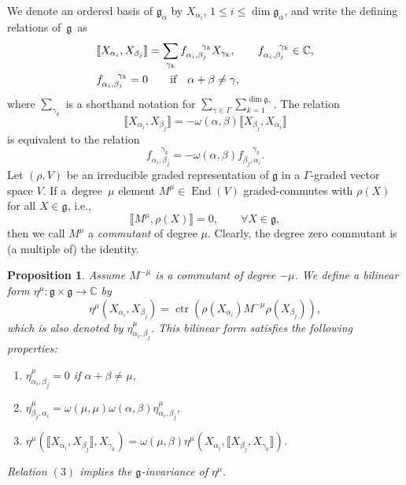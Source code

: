 \documentclass[pdftex]{sigma}
\numberwithin{equation}{section}
\newtheorem{Proposition}[Theorem]{Proposition}
\theoremstyle{definition}
\def\nn{\notag}
\def\g{\mathfrak{g}}
\begin{document}
We denote an ordered basis of $\g_{\alpha}$ by $ X_{\alpha_i}$, $1 \leq i \leq \dim \g_{\alpha}$, and write the defining relations of~$\g$~as
\begin{align}
	& 	\llbracket X_{\alpha_i}, X_{\beta_j} \rrbracket = \sum_{\gamma_k} f_{\alpha_i, \beta_j}^{\quad\ \gamma_k} X_{\gamma_k}, \qquad f_{\alpha_i, \beta_j}^{\quad\ \gamma_k} \in \mathbb{C}, \label{sumgammak}
	\\
	& f_{\alpha_i, \beta_j}^{\quad\ \gamma_k} = 0 \qquad \text{if} \quad \alpha + \beta \neq \gamma, \nn
\end{align}
where $\sum_{\gamma_k}$ is a shorthand notation for $\sum_{\gamma \in \Gamma} \sum_{k=1}^{\dim \g_{\gamma}}$.
The relation
\[
\llbracket X_{\alpha_i}, X_{\beta_j} \rrbracket = -\omega(\alpha,\beta) \llbracket X_{\beta_j}, X_{\alpha_i} \rrbracket
\]
 is equivalent to the relation
\begin{equation}
	f_{\alpha_i, \beta_j}^{\quad\ \gamma_k} = -\omega(\alpha,\beta) f_{\beta_j,\alpha_i}^{\quad\ \gamma_k}.
	\label{fskew}
\end{equation}
Let $(\rho,V)$ be an irreducible graded representation of $\g$ in a $\Gamma$-graded vector space $V$.
If a~degree~$\mu$ element $ M^{\mu} \in \operatorname{End}(V)$ graded-commutes with $\rho(X)$ for all $ X \in \g$, i.e.,
\begin{equation*}
	\llbracket M^{\mu}, \rho(X) \rrbracket = 0, \qquad \forall X \in \g,
\end{equation*}
then we call $M^{\mu}$ a \textit{commutant} of degree $\mu$.
Clearly, the degree zero commutant is (a multiple of) the identity.

\begin{Proposition} \label{PROP:BF}
Assume $M^{-\mu}$ is a commutant of degree $-\mu$.
	We define a bilinear form $\eta^{\mu}\colon \g \times \g \to \mathbb{C}$ by
	\begin{equation*}
		\eta^{\mu}(X_{\alpha_i}, X_{\beta_j}) = \operatorname{ctr}( \rho(X_{\alpha_i}) M^{-\mu} \rho(X_{\beta_j}) ), %
	\end{equation*}
	which is also denoted by $\eta^{\mu}_{\alpha_i,\beta_j}$. This bilinear form satisfies the following properties:
	\begin{enumerate}\itemsep=0pt
		\item[$(1)$] $ \eta^{\mu}_{\alpha_i, \beta_j} = 0$ if $ \alpha + \beta \neq \mu$,
		\item[$(2)$] $ \eta^{\mu}_{\beta_j,\alpha_i} = \omega(\mu,\mu) \omega(\alpha,\beta) \eta^{\mu}_{\alpha_i, \beta_j} $,
		\item[$(3)$] $ \eta^{\mu}(\llbracket X_{\alpha_i}, X_{\beta_j} \rrbracket, X_{\gamma_k} ) = \omega(\mu,\beta) \eta^{\mu}(X_{\alpha_i}, \llbracket X_{\beta_j}, X_{\gamma_k} \rrbracket) $.
	\end{enumerate}
	Relation $(3)$ implies the $\g$-invariance of $\eta^{\mu}$.
\end{Proposition}
\end{document}
